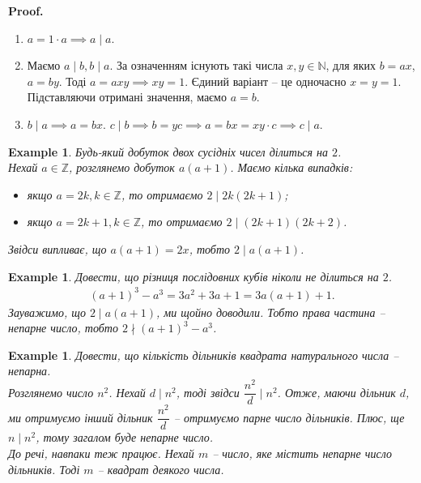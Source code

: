 \documentclass[a4paper, 10pt]{article}
\makeatletter
\theoremstyle{theoremdd}
\theoremstyle{theoremdd}
\theoremstyle{theoremdd}
\theoremstyle{theoremdd}
\newtheorem{example}[theorem]{Example}
\theoremstyle{theoremdd}
\theoremstyle{theoremdd}
\theoremstyle{theoremdd}
\theoremstyle{theoremdd}
\renewenvironment{proof}[1][Proof.\\]{\par
\pushQED{\hfill \qed}%
\normalfont \topsep6\p@\@plus6\p@\relax
\trivlist
\item\relax
{\bfseries
#1\@addpunct{.}}\hspace\labelsep\ignorespaces
}{%
\popQED\endtrivlist\@endpefalse
}
\newcommand\nospacebeforeitem{
\vspace{-\topsep}
\vspace{-\topsep}
\vspace{-\topsep}
}
\makeatother
\begin{document}
\begin{proof}
\nospacebeforeitem
\begin{enumerate}[wide=0pt,label={\arabic*)}]
\item $a = 1 \cdot a \implies a \mid a$.
\item Маємо $a \mid b, b \mid a$. За означенням існують такі числа $x,y \in \mathbb{N}$, для яких $b = ax$, $a = by$. Тоді $a = axy \implies xy = 1$. Єдиний варіант -- це одночасно $x = y = 1$. Підставляючи отримані значення, маємо $a = b$.
\item $b \mid a \implies a = bx$. $c \mid b \implies b = yc \implies a = bx = xy \cdot c \implies c \mid a$. \qedhere
\end{enumerate}
\end{proof}

\begin{example}
Будь-який добуток двох сусідніх чисел ділиться на $2$.\\
Нехай $a \in \mathbb{Z}$, розглянемо добуток $a(a+1)$. Маємо кілька випадків:
\begin{itemize}[nosep,wide=0pt]
\item якщо $a = 2k, k \in \mathbb{Z}$, то отримаємо $2 \mid 2k(2k+1)$;
\item якщо $a = 2k+1, k \in \mathbb{Z}$, то отримаємо $2 \mid (2k+1)(2k+2)$.
\end{itemize}
Звідси випливає, що $a(a+1) = 2x$, тобто $2 \mid a(a+1)$.
\end{example}

\begin{example}
Довести, що різниця послідовних кубів ніколи не ділиться на $2$.
\begin{align*}
(a+1)^3 - a^3 = 3a^2+3a+1 = 3a(a+1)+1.
\end{align*}
Зауважимо, що $2 \mid a(a+1)$, ми щойно доводили. Тобто права частина -- непарне число, тобто $2 \nmid (a+1)^3 - a^3$.
\end{example}

\begin{example}
Довести, що кількість дільників квадрата натурального числа -- непарна.\\
Розглянемо число $n^2$. Нехай $d \mid n^2$, тоді звідси $\dfrac{n^2}{d} \mid n^2$. Отже, маючи дільник $d$, ми отримуємо інший дільник $\dfrac{n^2}{d}$ -- отримуємо парне число дільників. Плюс, ще $n \mid n^2$, тому загалом буде непарне число.
\bigskip \\
До речі, навпаки теж працює. Нехай $m$ -- число, яке містить непарне число дільників. Тоді $m$ -- квадрат деякого числа.
\end{example}
\end{document}
